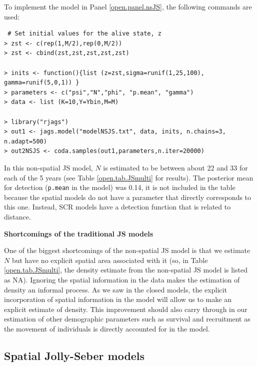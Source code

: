 To implement the model in Panel \ref{open.panel.nsJS}, the following commands
are used:

{\small
\begin{verbatim}
 # Set initial values for the alive state, z
> zst <- c(rep(1,M/2),rep(0,M/2))
> zst <- cbind(zst,zst,zst,zst,zst)

> inits <- function(){list (z=zst,sigma=runif(1,25,100), gamma=runif(5,0,1)) }
> parameters <- c("psi","N","phi", "p.mean", "gamma")
> data <- list (K=10,Y=Ybin,M=M)

> library("rjags")
> out1 <- jags.model("modelNSJS.txt", data, inits, n.chains=3, n.adapt=500)
> out2NSJS <- coda.samples(out1,parameters,n.iter=20000)
\end{verbatim}
}

In this non-spatial JS model, $N$ is estimated to be between about 22 and 33 for each of the 5 years (see
Table \ref{open.tab.JSmulti} for results).  The posterior mean for
detection (\mbox{\tt p.mean} in the model) was 0.14, it
is not included in the table because the spatial models do not have
a parameter that directly corresponds to this one. 
 Instead, SCR models have a detection function
that is related to distance.


{\bf Shortcomings of the traditional JS models}

One of the biggest shortcomings of the non-spatial
JS model is that we estimate $N$ but have no explicit spatial area
associated with it (so, 
in Table \ref{open.tab.JSmulti}, the density estimate from the non-spatial JS model
is listed as NA). 
Ignoring the 
spatial information in the data makes
the estimation of density
an informal process.  As we saw in the closed models, the explicit
incorporation of spatial information in the model will allow us to make an explicit
estimate of density. %
This improvement should
also carry through in our estimation of other demographic parameters
such as survival and recruitment as the movement of individuals is directly accounted for in the
model.


\subsection{Spatial Jolly-Seber models}

